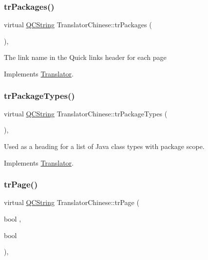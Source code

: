 \subsubsection{\texorpdfstring{trPackages()}{trPackages()}}
{\footnotesize\ttfamily virtual \mbox{\hyperlink{class_q_c_string}{Q\+C\+String}} Translator\+Chinese\+::tr\+Packages (\begin{DoxyParamCaption}{ }\end{DoxyParamCaption})\hspace{0.3cm}{\ttfamily [inline]}, {\ttfamily [virtual]}}

The link name in the Quick links header for each page 

Implements \mbox{\hyperlink{class_translator}{Translator}}.

\mbox{\label{class_translator_chinese_a25cae2f1f4bdf463655080cff7c362ef}} 
\subsubsection{\texorpdfstring{trPackageTypes()}{trPackageTypes()}}
{\footnotesize\ttfamily virtual \mbox{\hyperlink{class_q_c_string}{Q\+C\+String}} Translator\+Chinese\+::tr\+Package\+Types (\begin{DoxyParamCaption}{ }\end{DoxyParamCaption})\hspace{0.3cm}{\ttfamily [inline]}, {\ttfamily [virtual]}}

Used as a heading for a list of Java class types with package scope. 

Implements \mbox{\hyperlink{class_translator}{Translator}}.

\mbox{\label{class_translator_chinese_a9ee1adcfb54d28ad2ded307ec2c2d577}} 
\subsubsection{\texorpdfstring{trPage()}{trPage()}}
{\footnotesize\ttfamily virtual \mbox{\hyperlink{class_q_c_string}{Q\+C\+String}} Translator\+Chinese\+::tr\+Page (\begin{DoxyParamCaption}\item[{bool}]{,  }\item[{bool}]{ }\end{DoxyParamCaption})\hspace{0.3cm}{\ttfamily [inline]}, {\ttfamily [virtual]}}

